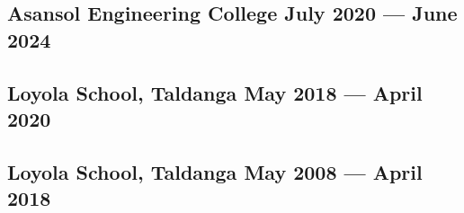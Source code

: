 





\subsection{{Asansol Engineering College \hfill July 2020 --- June 2024}}
\begin{null}

\end{null}

\subsection{{Loyola School, Taldanga \hfill May 2018 --- April 2020}}
\begin{null}

\end{null}

\subsection{{Loyola School, Taldanga \hfill May 2008 --- April 2018}}
\begin{null}

\end{null}

